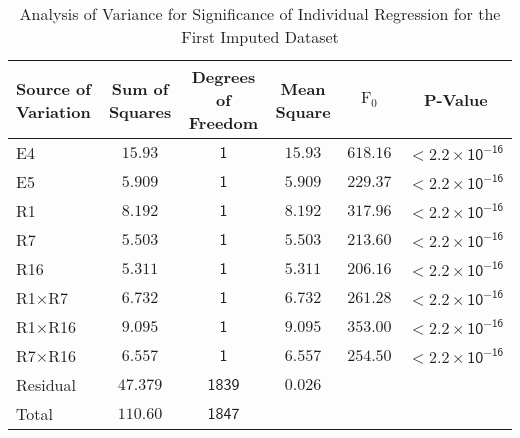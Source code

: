 \begin{table}[ht]
\centering
\begingroup\footnotesize
\caption{Analysis of Variance for Significance of Individual Regression for the First Imputed Dataset} 
\label{tab:anova2}
\begin{adjustbox}{width=\textwidth}
\begin{tabular}{lccccc}
\hline
\textbf{Source of Variation} & \textbf{Sum of Squares} & \textbf{Degrees of Freedom} & \textbf{Mean Square} & $\mathrm{F}_0$ & \textbf{P-Value} \\ 
\hline
E4 & $\mathsf{15.93}$ & $\mathsf{1}$ & $\mathsf{15.93}$ & $\mathsf{618.16}$ & $\mathsf{< 2.2\times 10^{-16}}$ \\
E5 & $\mathsf{5.909}$ & $\mathsf{1}$ & $\mathsf{5.909}$ & $\mathsf{229.37}$ & $\mathsf{< 2.2\times 10^{-16}}$ \\
R1 & $\mathsf{8.192}$ & $\mathsf{1}$ & $\mathsf{8.192}$ & $\mathsf{317.96}$ & $\mathsf{< 2.2\times 10^{-16}}$ \\
R7 & $\mathsf{5.503}$ & $\mathsf{1}$ & $\mathsf{5.503}$ & $\mathsf{213.60}$ & $\mathsf{< 2.2\times 10^{-16}}$ \\
R16 & $\mathsf{5.311}$ & $\mathsf{1}$ & $\mathsf{5.311}$ & $\mathsf{206.16}$ & $\mathsf{< 2.2\times 10^{-16}}$ \\
R1$\times$R7 & $\mathsf{6.732}$ & $\mathsf{1}$ & $\mathsf{6.732}$ & $\mathsf{261.28}$ & $\mathsf{< 2.2\times 10^{-16}}$ \\
R1$\times$R16 & $\mathsf{9.095}$ & $\mathsf{1}$ & $\mathsf{9.095}$ & $\mathsf{353.00}$ & $\mathsf{< 2.2\times 10^{-16}}$ \\
R7$\times$R16 & $\mathsf{6.557}$ & $\mathsf{1}$ & $\mathsf{6.557}$ & $\mathsf{254.50}$ & $\mathsf{< 2.2\times 10^{-16}}$ \\
Residual & $\mathsf{47.379}$ & $\mathsf{1839}$ & $\mathsf{0.026}$ &  &  \\
Total & $\mathsf{110.60}$ & $\mathsf{1847}$ &  &  &  \\
\hline
\end{tabular}
\end{adjustbox}
\endgroup
\end{table}